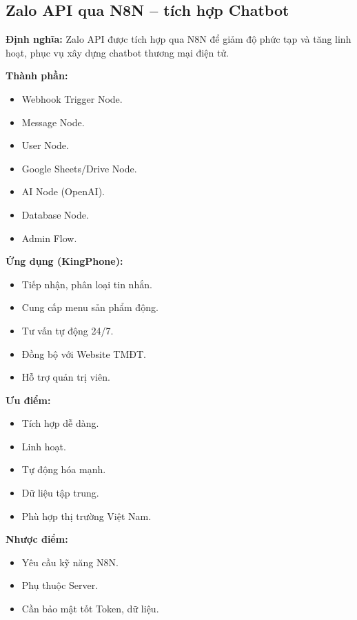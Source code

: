 
\subsection{Zalo API qua N8N – tích hợp Chatbot}

\textbf{Định nghĩa:} Zalo API được tích hợp qua N8N để giảm độ phức tạp và tăng linh hoạt, phục vụ xây dựng chatbot thương mại điện tử.

\textbf{Thành phần:}
\begin{itemize}
    \item Webhook Trigger Node.
    \item Message Node.
    \item User Node.
    \item Google Sheets/Drive Node.
    \item AI Node (OpenAI).
    \item Database Node.
    \item Admin Flow.
\end{itemize}

\textbf{Ứng dụng (KingPhone):}
\begin{itemize}
    \item Tiếp nhận, phân loại tin nhắn.
    \item Cung cấp menu sản phẩm động.
    \item Tư vấn tự động 24/7.
    \item Đồng bộ với Website TMĐT.
    \item Hỗ trợ quản trị viên.
\end{itemize}

\textbf{Ưu điểm:}
\begin{itemize}
    \item Tích hợp dễ dàng.
    \item Linh hoạt.
    \item Tự động hóa mạnh.
    \item Dữ liệu tập trung.
    \item Phù hợp thị trường Việt Nam.
\end{itemize}

\textbf{Nhược điểm:}
\begin{itemize}
    \item Yêu cầu kỹ năng N8N.
    \item Phụ thuộc Server.
    \item Cần bảo mật tốt Token, dữ liệu.
\end{itemize}

